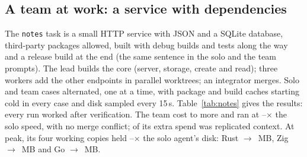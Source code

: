 \documentclass[11pt,a4paper]{article}
\begin{document}
\begin{table}[h]
\centering\small
\caption{Solo agent vs team on the \texttt{suite} task (medians of three). US\$: one solo run vs the whole
team (lead, three workers and integrator together). Works: runs that passed the
hidden tests in round 3 or after repair. s: the solo agent's time vs the team's wall-clock time from the
lead's start to the integrator's end. $\times$sooner: solo time divided by team time (above 1, the team
finished first). MB 3 trees: disk held by the three workers' worktrees with their build output.}
\label{tab:swarm}
\SwarmTable
\end{table}

\subsection{A team at work: a service with dependencies}

The \texttt{notes} task is a small HTTP service with JSON and a SQLite database, third-party packages
allowed, built with debug builds and tests along the way and a release build at the end (the same sentence in
the solo and the team prompts). The lead builds the core (server, storage, create and read); three workers add
the other endpoints in parallel worktrees; an integrator merges. Solo and team cases alternated, one at a
time, with package and build caches starting cold in every case and disk sampled every 15\,s.
Table~\ref{tab:notes} gives the results: every run worked after verification. The team cost
\NotesCostMin{} to \NotesCostMax{} more and ran at \NotesSpeedMin--\NotesSpeedMax$\times$ the solo
speed, with no merge conflict; \NotesShareContext{} of its extra spend was replicated context. At peak, its
four working copies held \NotesDiskMin--\NotesDiskMax$\times$ the solo agent's disk: Rust
\NotesPeakSoloRust{} $\to$ \NotesPeakTeamRust\,MB, Zig \NotesPeakSoloZig{} $\to$ \NotesPeakTeamZig\,MB and
Go \NotesPeakSoloGo{} $\to$ \NotesPeakTeamGo\,MB.

\begin{table}[h]
\centering\small
\caption{The \texttt{notes} service, solo agent vs team (medians of three). US\$: one solo run vs the whole
team. s: wall-clock time; the team's
split into the lead, the slowest worker and the integrator. MB peak: the largest total of the working copies
(one for the solo agent, the main tree and three worktrees for the team) seen while the agents worked; package
and build caches are not included (in Go they hold the dependencies, shared by all copies).}
\label{tab:notes}
\NotesTable
\end{table}
\end{document}
